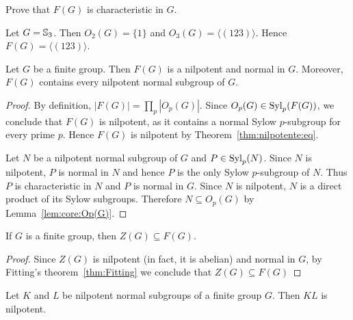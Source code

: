 \begin{exercise}
\label{xca:Fitting_char}
Prove that $F(G)$ is characteristic in $G$.
\end{exercise}


\begin{example}
Let $G=\mathbb{S}_3$. Then $O_2(G)=\{1\}$ and $O_3(G)=\langle
(123)\rangle$. Hence $F(G)=\langle (123)\rangle$.
\end{example}

\begin{theorem}[Fitting]
\label{thm:Fitting}
Let $G$ be a finite group. Then $F(G)$ is a nilpotent and normal in $G$.
Moreover, $F(G)$ contains every nilpotent normal subgroup of $G$.
\end{theorem}

\begin{proof}
By definition, $|F(G)|=\prod_p|O_p(G)|$.
Since $O_p(G)\in\mathrm{Syl}_p(F(G))$, we conclude that $F(G)$ is nilpotent, as it contains 
a normal Sylow $p$-subgroup for every prime $p$. 
Hence $F(G)$ is nilpotent by Theorem~\ref{thm:nilpotente:eq}.

Let $N$ be a nilpotent normal subgroup of $G$ and $P\in\mathrm{Syl}_p(N)$. Since 
$N$ is nilpotent, $P$ is normal in $N$ and hence $P$ is the only 
Sylow $p$-subgroup of $N$. Thus $P$ is characteristic in $N$ and 
$P$ is normal in $G$. Since $N$ is nilpotent, $N$ is a direct product of its Sylow subgroups. 
Therefore $N\subseteq O_p(G)$ by Lemma~\ref{lem:core:Op(G)}.
\end{proof}

\begin{corollary}
\label{cor:Z(G)subsetF(G)}
If $G$ is a finite group, then $Z(G)\subseteq F(G)$.
\end{corollary}

\begin{proof}
Since $Z(G)$ is nilpotent (in fact, it is abelian) and 
normal in $G$, by Fitting's theorem~\ref{thm:Fitting} we conclude that 
$Z(G)\subseteq F(G)$ 
\end{proof}

\begin{corollary}[Fitting]
\label{cor:Fitting}
Let $K$ and $L$ be nilpotent normal subgroups of a finite group $G$. 
Then $KL$ is nilpotent. 
\end{corollary}

